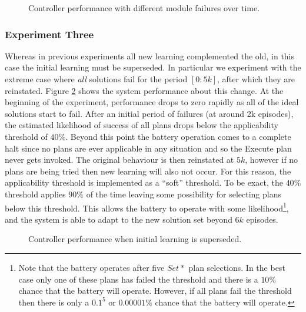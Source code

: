 \begin{figure}[ht]
\begin{center}

\end{center}
\caption{Controller performance with different module failures over time.}
\label{fig:experiment2}
\end{figure}

\subsubsection{Experiment Three}

Whereas in previous experiments all new learning complemented the old, in this case the initial learning must be superseded. In particular we experiment with the extreme case where {\em all} solutions fail for the period $[0:5k]$, after which they are reinstated. Figure \ref{fig:experiment3} shows the system performance about this change. At the beginning of the experiment, performance drops to zero rapidly as all of the ideal solutions start to fail. After an initial period of failures (at around 2k episodes), the estimated likelihood of success of all plans drops below the applicability threshold of $40\%$. Beyond this point the battery operation comes to a complete halt since no plans are ever applicable in any situation and so the Execute plan never gets invoked. The original behaviour is then reinstated at $5k$, however if no plans are being tried then new learning will also not occur. For this reason, the applicability threshold is implemented as a ``soft'' threshold. To be exact, the $40\%$ threshold applies $90\%$ of the time leaving some possibility for selecting plans below this threshold. This allows the battery to operate with some likelihood\footnote{Note that the battery operates after five $Set*$ plan selections. In the best case only one of these plans has failed the threshold and there is a $10\%$ chance that the battery will operate. However, if all plans fail the threshold then there is only a $0.1^5$ or $0.00001\%$ chance that the battery will operate.}, and the system is able to adapt to the new solution set beyond $6k$ episodes.


\begin{figure}[ht]
\begin{center}

\end{center}
\caption{Controller performance when initial learning is superseded.}
\label{fig:experiment3}
\end{figure}
